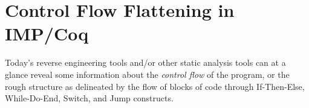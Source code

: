 \documentclass[compsoc,conference,a4paper,10pt,times]{IEEEtran}
\newtheorem{example}[theorem]{Example}
\begin{document}






\section{Control Flow Flattening in IMP/Coq}\label{sec:flattening}
Today's reverse engineering tools and/or other static analysis tools can at a glance reveal some information about the \emph{control flow} of the program, or the rough structure as delineated by the flow of blocks of code through If-Then-Else, While-Do-End, Switch, and Jump constructs. 
\end{document}
